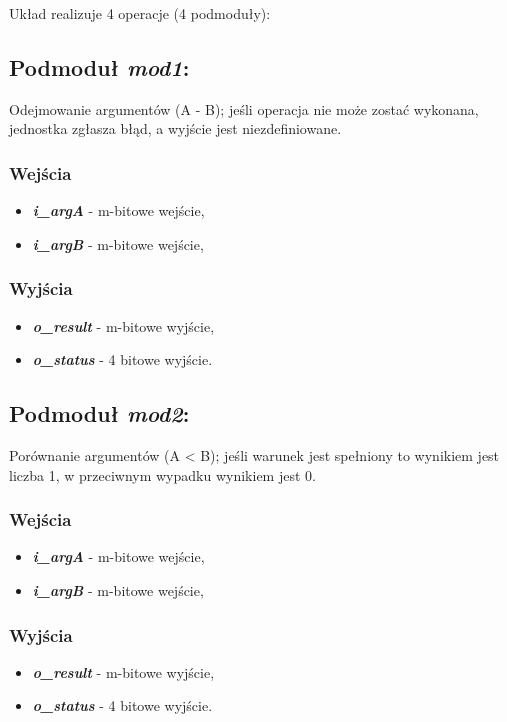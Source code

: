 Układ realizuje 4 operacje (4 podmoduły):

\subsection{Podmoduł \emph{mod1}:}
Odejmowanie argumentów (A - B); jeśli operacja nie może zostać wykonana, jednostka zgłasza błąd, a wyjście jest niezdefiniowane.

\subsubsection*{Wejścia}
\begin{itemize}
	\item \emph{\textbf{i\_argA}} - m-bitowe wejście,
	\item \emph{\textbf{i\_argB}} - m-bitowe wejście,
\end{itemize}
\subsubsection*{Wyjścia}
\begin{itemize} 
	\item \emph{\textbf{o\_result}} - m-bitowe wyjście,
	\item \emph{\textbf{o\_status}} - 4 bitowe wyjście.
\end{itemize}

\subsection{Podmoduł \emph{mod2}:}
Porównanie argumentów (A < B); jeśli warunek jest spełniony to wynikiem jest liczba 1, w przeciwnym wypadku wynikiem jest 0.

\subsubsection*{Wejścia}
\begin{itemize}
	\item \emph{\textbf{i\_argA}} - m-bitowe wejście,
	\item \emph{\textbf{i\_argB}} - m-bitowe wejście,
\end{itemize}
\subsubsection*{Wyjścia}
\begin{itemize}
	\item \emph{\textbf{o\_result}} - m-bitowe wyjście,
	\item \emph{\textbf{o\_status}} - 4 bitowe wyjście.
\end{itemize}

